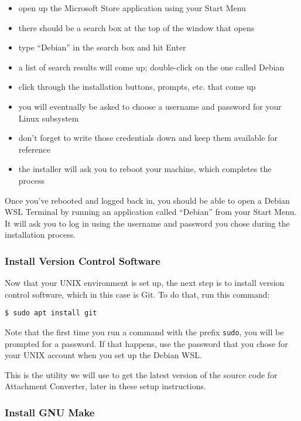 \documentclass[11pt]{article}
\begin{document}
\begin{itemize}
\item open up the Microsoft Store application using your Start Menu
\item there should be a search box at the top of the window that opens
\item type ``Debian'' in the search box and hit Enter
\item a list of search results will come up; double-click on the one
called Debian
\item click through the installation buttons, prompts, etc. that come up
\item you will eventually be asked to choose a username and password for
your Linux subsystem
\item don't forget to write those credentials down and keep them available
for reference
\item the installer will ask you to reboot your machine, which completes
the process
\end{itemize}

Once you've rebooted and logged back in, you should be able to open a
Debian WSL Terminal by running an application called ``Debian'' from
your Start Menu.  It will ask you to log in using the username and
password you chose during the installation process.

\subsubsection{Install Version Control Software}
\label{sec:orgbcfef95}

Now that your UNIX environment is set up, the next step is to install
version control software, which in this case is Git.  To do that, run
this command:

\begin{verbatim}
$ sudo apt install git
\end{verbatim}

Note that the first time you run a command with the prefix \texttt{sudo}, you
will be prompted for a password.  If that happens, use the password
that you chose for your UNIX account when you set up the Debian WSL.

This is the utility we will use to get the latest version of the
source code for Attachment Converter, later in these setup
instructions.

\subsubsection{Install GNU Make}
\label{sec:org9a5f9df}
\end{document}
